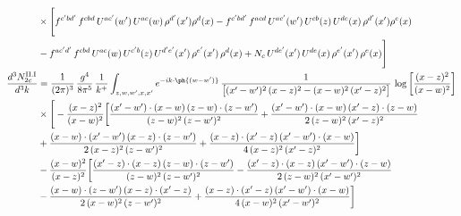 \begin{align}
&\times\Bigg[f^{c^{\prime}bd^{\prime}}\,f^{cbd}\, U^{ac^{\prime}}(w^{\prime})\,U^{ac}(w)\,\rho^{d^{\prime}}(x^{\prime})\rho^{d}(x)- f^{c^{\prime}bd^{\prime}}\,f^{acd}\,U^{ac^{\prime}}(w^{\prime})\,U^{cb}(z)\,U^{de}(x)\,\rho^{d^{\prime}}(x^{\prime})\rho^{e}(x) \notag \\ & -f^{ac^{\prime}d^{\prime}}\,f^{cbd}\,U^{ac}(w)\,U^{c^{\prime}b}(z)\,U^{d^{\prime}e^{\prime}}(x^{\prime})\,\rho^{e^{\prime}}(x^{\prime})\,\rho^{d}(x) +N_{c}\,U^{de^{\prime}}(x^{\prime})\,U^{de}(x)\,\rho^{e^{\prime}}(x^{\prime})\,\rho^{e}(x)\Bigg]\label{eq:B-II2b}\\
\frac{d^{3}N^{\rm II.I}_{2c}}{d^{3}k} &= \frac{1}{(2\pi)^{3}}\,\frac{g^{4}}{8\pi^{5}}\,\frac{1}{k^{+}}\int_{z,w,w^{\prime},x,x^{\prime}}e^{-ik\cdot\ph{(w-w^{\prime})}}\,\frac{1}{\big[(x^{\prime}-w^{\prime})^{2}\,(x-z)^{2}-(x-w)^{2}\,(x^{\prime}-z)^{2}\big]}\,\log\left[\frac{(x-z)^{2}}{(x-w)^{2}}\right]\notag\\
&\times\Bigg[-\frac{(x-z)^{2}}{(x-w)^{2}}\bigg[\frac{(x^{\prime}-w^{\prime})\cdot(x-w)\,(z-w)\cdot(z-w^{\prime})}{(z-w)^{2}\,(z-w^{\prime})^{2}}+\frac{(x^{\prime}-w^{\prime})\cdot(x-w)\,(x^{\prime}-z)\cdot(z-w)}{2\,(z-w)^{2}\,(x^{\prime}-z)^{2}}\notag \\ & +\frac{(x-w)\cdot(x^{\prime}-w^{\prime})\,(x-z)\cdot(z-w^{\prime})}{2\,(x-z)^{2}\,(z-w^{\prime})^{2}}+\frac{(x-z)\cdot(x^{\prime}-z)\,(x^{\prime}-w^{\prime})\cdot(x-w)}{4\,(x-z)^{2}\,(x^{\prime}-z)^{2}}\bigg]\notag\\
&-\frac{(x-w)^{2}}{(x-z)^{2}}\bigg[\frac{(x^{\prime}-z)\cdot(x-z)\,(z-w)\cdot(z-w^{\prime})}{(z-w)^{2}\,(z-w^{\prime})^{2}}-\frac{(x^{\prime}-z)\cdot(x-z)\,(x^{\prime}-w^{\prime})\cdot(z-w)}{2\,(z-w)^{2}\,(x^{\prime}-w^{\prime})^{2}}\notag \\ & -\frac{(x-w)\cdot(z-w^{\prime})\,(x-z)\cdot(x^{\prime}-z)}{2\,(x-w)^{2}\,(z-w^{\prime})^{2}}+\frac{(x-z)\cdot(x^{\prime}-z)\,(x^{\prime}-w^{\prime})\cdot(x-w)}{4\,(x-w)^{2}\,(x^{\prime}-w^{\prime})^{2}}\bigg]\notag\\

\end{align}

